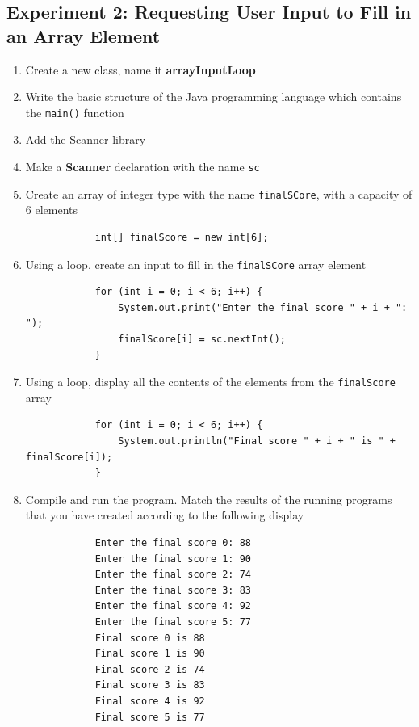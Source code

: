 \documentclass[12pt,titlepage]{article}
\begin{document}
\subsection{Experiment 2: Requesting User Input to Fill in an Array Element}
\begin{enumerate}
    \item Create a new class, name it \textbf{arrayInputLoop}
    \item Write the basic structure of the Java programming language which contains the \texttt{main()} function
    \item Add the Scanner library
    \item Make a \textbf{Scanner} declaration with the name \texttt{sc}
    \item {
        Create an array of integer type with the name \texttt{finalSCore}, with a capacity of 6 elements

        \begin{verbatim}
            int[] finalScore = new int[6];
        \end{verbatim}
    }
    \item {
        Using a loop, create an input to fill in the \texttt{finalSCore} array element
        
        \begin{verbatim}
            for (int i = 0; i < 6; i++) {
                System.out.print("Enter the final score " + i + ": ");
                finalScore[i] = sc.nextInt();
            }
        \end{verbatim}
    }
    \item {
        Using a loop, display all the contents of the elements from the \texttt{finalScore} array

        \begin{verbatim}
            for (int i = 0; i < 6; i++) {
                System.out.println("Final score " + i + " is " + finalScore[i]);
            }
        \end{verbatim}
    }
    \pagebreak
    \item {
        Compile and run the program. Match the results of the running programs that you have created according to the following display

        \begin{verbatim}
            Enter the final score 0: 88
            Enter the final score 1: 90
            Enter the final score 2: 74
            Enter the final score 3: 83
            Enter the final score 4: 92
            Enter the final score 5: 77
            Final score 0 is 88
            Final score 1 is 90
            Final score 2 is 74
            Final score 3 is 83
            Final score 4 is 92
            Final score 5 is 77
        \end{verbatim}

}
\end{enumerate}
\end{document}
